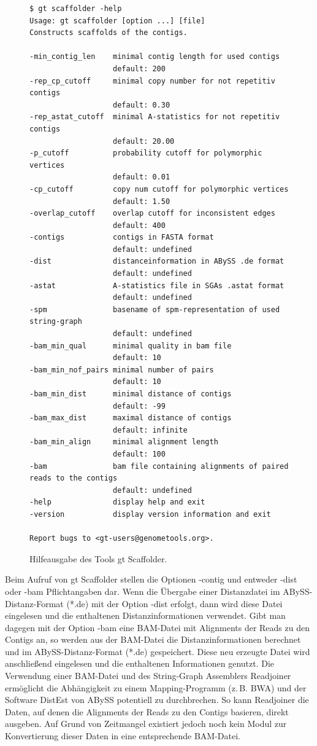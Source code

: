 \documentclass[a4paper,11pt,parskip]{scrartcl}
\begin{document}
\begin{figure}
\begin{verbatim}
$ gt scaffolder -help
Usage: gt scaffolder [option ...] [file]
Constructs scaffolds of the contigs.

-min_contig_len    minimal contig length for used contigs
                   default: 200
-rep_cp_cutoff     minimal copy number for not repetitiv contigs
                   default: 0.30
-rep_astat_cutoff  minimal A-statistics for not repetitiv contigs
                   default: 20.00
-p_cutoff          probability cutoff for polymorphic vertices
                   default: 0.01
-cp_cutoff         copy num cutoff for polymorphic vertices
                   default: 1.50
-overlap_cutoff    overlap cutoff for inconsistent edges
                   default: 400
-contigs           contigs in FASTA format
                   default: undefined
-dist              distanceinformation in ABySS .de format
                   default: undefined
-astat             A-statistics file in SGAs .astat format
                   default: undefined
-spm               basename of spm-representation of used string-graph
                   default: undefined
-bam_min_qual      minimal quality in bam file
                   default: 10
-bam_min_nof_pairs minimal number of pairs
                   default: 10
-bam_min_dist      minimal distance of contigs
                   default: -99
-bam_max_dist      maximal distance of contigs
                   default: infinite
-bam_min_align     minimal alignment length
                   default: 100
-bam               bam file containing alignments of paired reads to the contigs
                   default: undefined
-help              display help and exit
-version           display version information and exit

Report bugs to <gt-users@genometools.org>.
\end{verbatim}
\caption{\label{abb: help}Hilfeausgabe des Tools gt Scaffolder.}
\end{figure}

Beim Aufruf von gt Scaffolder stellen die Optionen -contig und entweder
-dist oder -bam Pflichtangaben dar. Wenn die Übergabe einer Distanzdatei
im ABySS-Distanz-Format (*.de) mit der Option -dist erfolgt, dann wird
diese Datei eingelesen und die enthaltenen Distanzinformationen verwendet.
Gibt man dagegen mit der Option -bam eine BAM-Datei mit Alignments der Reads
zu den Contigs an, so werden aus der BAM-Datei die Distanzinformationen
berechnet und im ABySS-Distanz-Format (*.de) gespeichert. Diese neu erzeugte
Datei wird anschließend eingelesen und die enthaltenen Informationen genutzt.
Die Verwendung einer BAM-Datei und des String-Graph Assemblers Readjoiner
ermöglicht die Abhängigkeit zu einem Mapping-Programm (z.\,B. BWA) und der
Software DistEst von ABySS potentiell zu durchbrechen. So kann Readjoiner die
Daten, auf denen die Alignments der Reads zu den Contigs basieren, direkt
ausgeben. Auf Grund von Zeitmangel existiert jedoch noch kein Modul zur
Konvertierung dieser Daten in eine entsprechende BAM-Datei.
\end{document}
